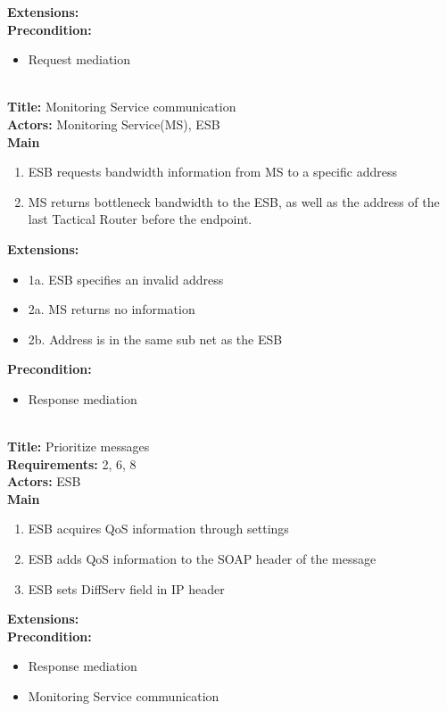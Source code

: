     \textbf{Extensions:} \\
    \textbf{Precondition:}
    \begin{itemize}
        \item Request mediation
    \end{itemize}
    ~\\
    \textbf{Title:} Monitoring Service communication\\
    \textbf{Actors:} Monitoring Service(MS), ESB\\
    \textbf{Main}
    \begin{enumerate}
        \item ESB requests bandwidth information from MS to a specific address
        \item MS returns bottleneck bandwidth to the ESB, as well as the address of the last Tactical Router before the endpoint.
    \end{enumerate}
    \textbf{Extensions:}
    \begin{itemize}
        \item[]	1a. ESB specifies an invalid address
        \item[]	2a. MS returns no information
        \item[]	2b. Address is in the same sub net as the ESB
    \end{itemize}
    \textbf{Precondition:}
    \begin{itemize}
        \item Response mediation
    \end{itemize}
    ~\\
    \textbf{Title:} Prioritize messages\\
    \textbf{Requirements:} 2, 6, 8\\
    \textbf{Actors:} ESB\\
    \textbf{Main}
    \begin{enumerate}
        \item ESB acquires QoS information through settings
        \item ESB adds QoS information to the SOAP header of the message
        \item ESB sets DiffServ field in IP header
    \end{enumerate}
    \textbf{Extensions:}\\
    \textbf{Precondition:}
    \begin{itemize}
        \item Response mediation
        \item Monitoring Service communication
    \end{itemize}

